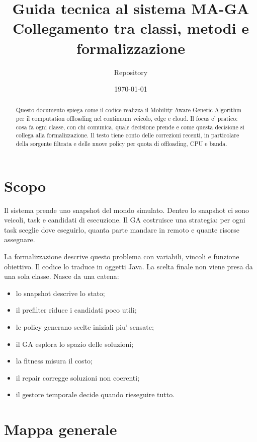 \documentclass[11pt,a4paper]{article}
\title{\textbf{Guida tecnica al sistema MA-GA}\\
\large Collegamento tra classi, metodi e formalizzazione}
\author{Repository \code{maga-core}}
\date{\today}
\begin{document}
\maketitle

\begin{abstract}
Questo documento spiega come il codice realizza il Mobility-Aware Genetic
Algorithm per il computation offloading nel continuum veicolo, edge e cloud.
Il focus e' pratico: cosa fa ogni classe, con chi comunica, quale decisione
prende e come questa decisione si collega alla formalizzazione. Il testo tiene
conto delle correzioni recenti, in particolare della sorgente filtrata e delle
nuove policy per quota di offloading, CPU e banda.
\end{abstract}

\tableofcontents
\newpage

\section{Scopo}

Il sistema prende uno snapshot del mondo simulato. Dentro lo snapshot ci sono
veicoli, task e candidati di esecuzione. Il GA costruisce una strategia:
per ogni task sceglie dove eseguirlo, quanta parte mandare in remoto e quante
risorse assegnare.

La formalizzazione descrive questo problema con variabili, vincoli e funzione
obiettivo. Il codice lo traduce in oggetti Java. La scelta finale non viene
presa da una sola classe. Nasce da una catena:

\begin{itemize}[leftmargin=*,nosep]
    \item lo snapshot descrive lo stato;
    \item il prefilter riduce i candidati poco utili;
    \item le policy generano scelte iniziali piu' sensate;
    \item il GA esplora lo spazio delle soluzioni;
    \item la fitness misura il costo;
    \item il repair corregge soluzioni non coerenti;
    \item il gestore temporale decide quando rieseguire tutto.
\end{itemize}

\section{Mappa generale}
\end{document}
